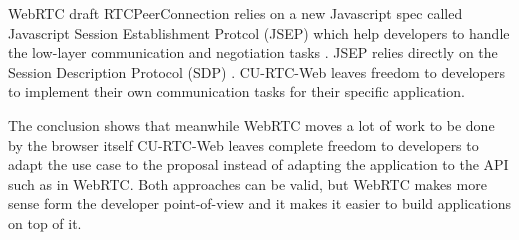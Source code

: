 WebRTC draft RTCPeerConnection relies on a new Javascript spec called Javascript Session Establishment Protcol (JSEP) which help developers to handle the low-layer communication and negotiation tasks \cite{jsepIETF}. JSEP relies directly on the Session Description Protocol (SDP) \cite{sdpIETF}. CU-RTC-Web leaves freedom to developers to implement their own communication tasks for their specific application.

The conclusion shows that meanwhile WebRTC moves a lot of work to be done by the browser itself CU-RTC-Web leaves complete freedom to developers to adapt the use case to the proposal instead of adapting the application to the API such as in WebRTC. Both approaches can be valid, but WebRTC makes more sense form the developer point-of-view and it makes it easier to build applications on top of it.